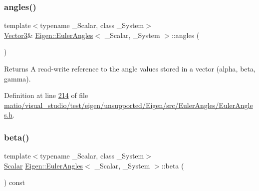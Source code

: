 \subsubsection{\texorpdfstring{angles()}{angles()}\hspace{0.1cm}{\footnotesize\ttfamily [4/4]}}
{\footnotesize\ttfamily template$<$typename \+\_\+\+Scalar, class \+\_\+\+System$>$ \\
\hyperlink{class_eigen_1_1_euler_angles_af0f446aa0f46b3439abedff63fabf39c}{Vector3}\& \hyperlink{class_eigen_1_1_euler_angles}{Eigen\+::\+Euler\+Angles}$<$ \+\_\+\+Scalar, \+\_\+\+System $>$\+::angles (\begin{DoxyParamCaption}{ }\end{DoxyParamCaption})\hspace{0.3cm}{\ttfamily [inline]}}

\begin{DoxyReturn}{Returns}
A read-\/write reference to the angle values stored in a vector (alpha, beta, gamma). 
\end{DoxyReturn}


Definition at line \hyperlink{matio_2visual__studio_2test_2eigen_2unsupported_2_eigen_2src_2_euler_angles_2_euler_angles_8h_source_l00214}{214} of file \hyperlink{matio_2visual__studio_2test_2eigen_2unsupported_2_eigen_2src_2_euler_angles_2_euler_angles_8h_source}{matio/visual\+\_\+studio/test/eigen/unsupported/\+Eigen/src/\+Euler\+Angles/\+Euler\+Angles.\+h}.

\mbox{\label{class_eigen_1_1_euler_angles_a1bf59f8acaed985964c98c1f59d8f5ab}} 
\subsubsection{\texorpdfstring{beta()}{beta()}\hspace{0.1cm}{\footnotesize\ttfamily [1/4]}}
{\footnotesize\ttfamily template$<$typename \+\_\+\+Scalar, class \+\_\+\+System$>$ \\
\hyperlink{class_eigen_1_1_euler_angles_a2ab1d433ac9683268446f8905ac31aac}{Scalar} \hyperlink{class_eigen_1_1_euler_angles}{Eigen\+::\+Euler\+Angles}$<$ \+\_\+\+Scalar, \+\_\+\+System $>$\+::beta (\begin{DoxyParamCaption}{ }\end{DoxyParamCaption}) const\hspace{0.3cm}{\ttfamily [inline]}}

